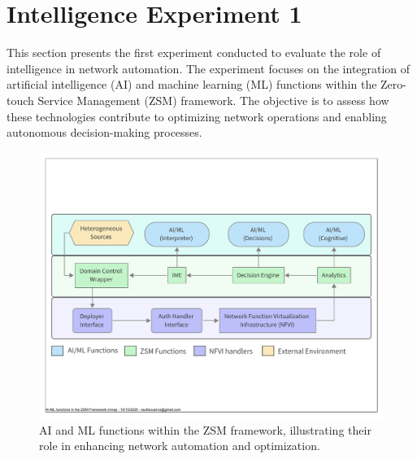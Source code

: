 
\section{Intelligence Experiment 1}\label{int:1}
This section presents the first experiment conducted to evaluate the role of intelligence in network automation. The experiment focuses on the integration of artificial intelligence (AI) and machine learning (ML) functions within the Zero-touch Service Management (ZSM) framework. The objective is to assess how these technologies contribute to optimizing network operations and enabling autonomous decision-making processes.

\begin{figure}[!htb]
    \centering
    \includegraphics[width=1\columnwidth]{Topics/Intelligence/Figures/AI-ML functions in the ZSM Framework.pdf}
    \caption{AI and ML functions within the ZSM framework, illustrating their role in enhancing network automation and optimization.}
    \label{fig:exp1-figure}
\end{figure}